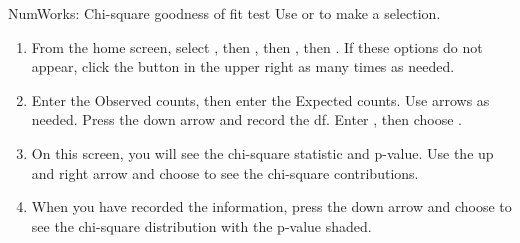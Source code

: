 \begin{onebox}{NumWorks: Chi-square goodness of fit test}
\label{normalnumworks}
Use  or  to make a selection.
\begin{enumerate}
\setlength{\itemsep}{0mm}
\item From the home screen, select , then , then , then .  If these options do not appear, click the \calcbutton{$\lhookleftarrow$} button in the upper right as many times as needed. 
\item Enter the Observed counts, then enter the Expected counts.  Use arrows as needed.  Press the down arrow and record the df.  Enter \calctext{$\alpha$}, then choose . 
\item On this screen, you will see the chi-square statistic and p-value.  Use the up and right arrow and choose  to see the chi-square contributions.  
\begin{center}
\hspace{10mm}
\end{center}
\item When you have recorded the information, press the down arrow and choose  to see the chi-square distribution with the p-value shaded.  
\begin{center}
\hspace{10mm}
\end{center}
\vspace{-1.5mm}
\end{enumerate}
\end{onebox}
 
